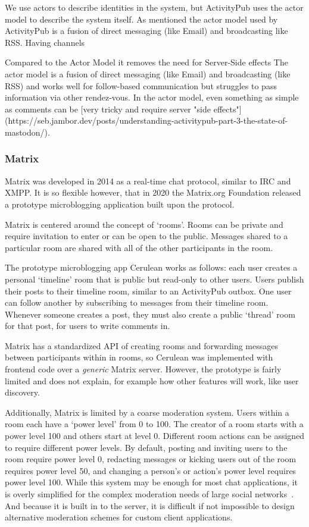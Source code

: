 We use actors to describe identities in the system,
but ActivityPub uses the actor model to describe the system itself.
As mentioned the actor model used by ActivityPub is a fusion of
direct messaging (like Email) and broadcasting like RSS.
Having channels

Compared to the Actor Model it removes the need for Server-Side effects
The actor model is a fusion of direct messaging (like Email) and broadcasting
(like RSS) and works well for follow-based communication but struggles
to pass information via other rendez-vous.
In the actor model, even something as simple as comments can be
[very tricky and require server "side effects"](https://seb.jambor.dev/posts/understanding-activitypub-part-3-the-state-of-mastodon/).

\subsubsection{Matrix}

Matrix was developed in 2014 as a real-time chat protocol, similar to IRC and XMPP.
It is so flexible however, that in 2020 the Matrix.org Foundation released a prototype microblogging application built upon the protocol.

Matrix is centered around the concept of `rooms'.
Rooms can be private and require invitation to enter or can be open to the public.
Messages shared to a particular room are shared with all of the other participants in the room.

The prototype microblogging app Cerulean works as follows:
each user creates a personal `timeline' room that is public but read-only to other users. Users publish their posts to their timeline room, similar to an ActivityPub outbox. One user can follow another by subscribing to messages from their timeline room.
Whenever someone creates a post, they must also create a public `thread' room for that post, for users to write comments in.

Matrix has a standardized API of creating rooms and forwarding messages between participants within in rooms, so Cerulean was implemented with frontend code over a \emph{generic} Matrix server.
However, the prototype is fairly limited and does not explain, for example how other features will work, like user discovery.

Additionally, Matrix is limited by a coarse moderation system.
Users within a room each have a `power level' from 0 to 100.
The creator of a room starts with a power level 100 and others start at level 0.
Different room actions can be assigned to require different power levels. By default, posting and inviting users to the room require power level 0, redacting messages or kicking users out of the room requires power level 50, and changing a person's or action's power level requires power level 100.
While this system may be enough for most chat applications, it is overly simplified for the complex moderation needs of large social networks~\cite{policykit}.   And because it is built in to the server, it is difficult if not impossible to design alternative moderation schemes for custom client applications.


